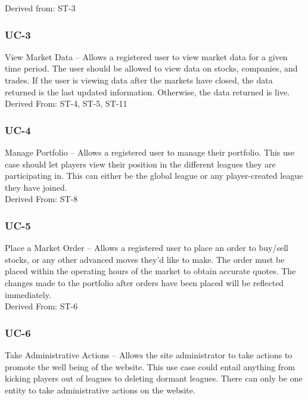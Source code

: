 Derived from: ST-3\\

\subsubsection {UC-3} View Market Data – Allows a registered user to view market data for a given time period. The user should be allowed to view data on stocks, companies, and trades. If the user is viewing data after the markets have closed, the data returned is the last updated information. Otherwise, the data returned is live. \\

Derived From: ST-4, ST-5, ST-11\\

\subsubsection {UC-4} Manage Portfolio – Allows a registered user to manage their portfolio. This use case should let players view their position in the different leagues they are participating in. This can either be the global league or any player-created league they have joined. \\

Derived From: ST-8\\

\subsubsection {UC-5} Place a Market Order – Allows a registered user to place an order to buy/sell stocks, or any other advanced moves they’d like to make. The order must be placed within the operating hours of the market to obtain accurate quotes. The changes made to the portfolio after orders have been placed will be reflected immediately.\\

Derived From: ST-6\\

\subsubsection {UC-6} Take Administrative Actions – Allows the site administrator to take actions to promote the well being of the website. This use case could entail anything from kicking players out of leagues to deleting dormant leagues. There can only be one entity to take administrative actions on the website.\\


